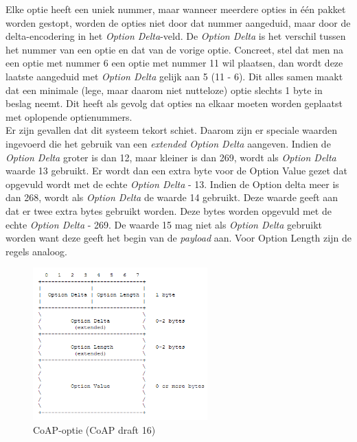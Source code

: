 Elke optie heeft een uniek nummer, maar wanneer meerdere opties in \'{e}\'{e}n pakket worden gestopt, worden de opties niet door dat nummer aangeduid, maar door de delta-encodering in het \textit{Option Delta}-veld. De \textit{Option Delta} is het verschil tussen het nummer van een optie en dat van de vorige optie.
Concreet, stel dat men na een optie met nummer 6 een optie met nummer 11 wil plaatsen, dan wordt deze laatste aangeduid met \textit{Option Delta} gelijk aan 5 (11 - 6). Dit alles samen maakt dat een minimale (lege, maar daarom niet nutteloze) optie slechts 1 byte in beslag neemt. Dit heeft als gevolg dat opties na elkaar moeten worden geplaatst met oplopende optienummers.\\

Er zijn gevallen dat dit systeem tekort schiet. Daarom zijn er speciale waarden ingevoerd die het gebruik van een \textit{extended Option Delta} aangeven. Indien de \textit{Option Delta} groter is dan 12, maar kleiner is dan 269, wordt als \textit{Option Delta} waarde 13 gebruikt. Er wordt dan een extra byte voor de Option Value gezet dat opgevuld wordt met de echte \textit{Option Delta} - 13. Indien de Option delta meer is dan 268, wordt als \textit{Option Delta} de waarde 14 gebruikt. Deze waarde geeft aan dat er twee extra bytes gebruikt worden. Deze bytes worden opgevuld met de echte \textit{Option Delta} - 269. De waarde 15 mag niet als \textit{Option Delta} gebruikt worden want deze geeft het begin van de \textit{payload} aan. Voor Option Length zijn de regels analoog.


\begin{figure}[h]
\centering
\includegraphics[width=0.6\textwidth]{fig/CoAPOpties}
\vspace{-10pt}
\caption{CoAP-optie (CoAP draft 16)}
\label{fig:CoAPOpties}
\end{figure}

